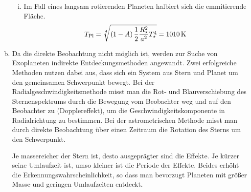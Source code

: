 \documentclass[a4paper,german,12pt,smallheadings]{scrartcl}
\begin{document}
\begin{enumerate}[a)]
\begin{enumerate}[(i)]
      \item
        Im Fall eines langsam rotierenden Planeten halbiert sich die
        emmitierende Fläche.
        \begin{equation}
          T_\text{Pl} = \sqrt[4]{
            \del{1-A} \frac{1}{2} \frac{R_\star^2}{a^2} T_\star^4
          } = \SI{1010}{\kelvin}
        \end{equation}

    \end{enumerate}
  \item
    Da die direkte Beobachtung nicht möglich ist, werden zur Suche von
    Exoplaneten indirekte Entdeckungsmethoden angewandt. Zwei erfolgreiche
    Methoden nutzen dabei aus, dass sich ein System aus Stern und Planet um den
    gemeinsamen Schwerpunkt bewegt. Bei der Radialgeschwindigkeitsmethode misst
    man die Rot- und Blauverschiebung des Sternenspektrums durch die Bewegung
    vom Beobachter weg und auf den Beobachter zu (Dopplereffekt), um die
    Geschwindigkeitskomponente in Radialrichtung zu bestimmen. Bei der
    astrometrischen Methode misst man durch direkte Beobachtung über einen
    Zeitraum die Rotation des Sterns um den Schwerpunkt.

    Je massereicher der Stern ist, desto ausgeprägter sind die Effekte. Je
    kürzer seine Umlaufzeit ist, umso kleiner ist die Periode der Effekte.
    Beides erhöht die Erkennungswahrscheinlichkeit, so dass man bevorzugt
    Planeten mit größer Masse und geringen Umlaufzeiten entdeckt.
\end{enumerate}
\end{document}
